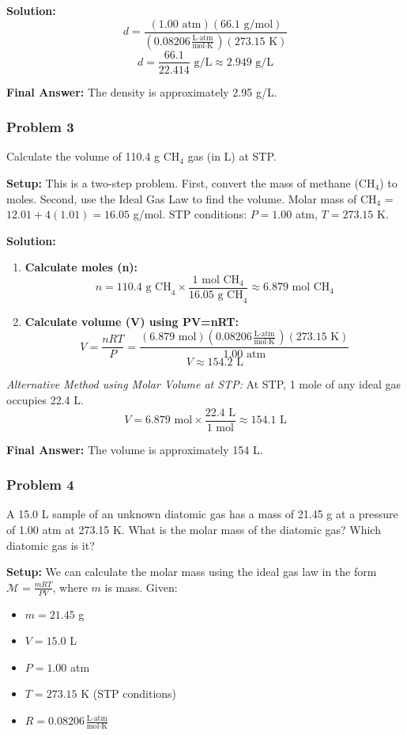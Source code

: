 \documentclass{article}
\begin{document}
\textbf{Solution:}
\[ d = \frac{(1.00 \text{ atm})(66.1 \text{ g/mol})}{(0.08206 \frac{\text{L} \cdot \text{atm}}{\text{mol} \cdot \text{K}})(273.15 \text{ K})} \]
\[ d = \frac{66.1}{22.414} \text{ g/L} \approx 2.949 \text{ g/L} \]

\textbf{Final Answer:} The density is approximately 2.95 g/L.

\subsubsection{Problem 3}
Calculate the volume of 110.4 g CH$_4$ gas (in L) at STP.

\textbf{Setup:}
This is a two-step problem. First, convert the mass of methane (CH$_4$) to moles. Second, use the Ideal Gas Law to find the volume.
Molar mass of CH$_4$ = $12.01 + 4(1.01) = 16.05$ g/mol.
STP conditions: $P=1.00$ atm, $T=273.15$ K.

\textbf{Solution:}
\begin{enumerate}
    \item \textbf{Calculate moles (n):}
    \[ n = 110.4 \text{ g CH}_4 \times \frac{1 \text{ mol CH}_4}{16.05 \text{ g CH}_4} \approx 6.879 \text{ mol CH}_4 \]
    \item \textbf{Calculate volume (V) using PV=nRT:}
    \[ V = \frac{nRT}{P} = \frac{(6.879 \text{ mol})(0.08206 \frac{\text{L} \cdot \text{atm}}{\text{mol} \cdot \text{K}})(273.15 \text{ K})}{1.00 \text{ atm}} \]
    \[ V \approx 154.2 \text{ L} \]
\end{enumerate}

\textit{Alternative Method using Molar Volume at STP:} At STP, 1 mole of any ideal gas occupies 22.4 L.
\[ V = 6.879 \text{ mol} \times \frac{22.4 \text{ L}}{1 \text{ mol}} \approx 154.1 \text{ L} \]

\textbf{Final Answer:} The volume is approximately 154 L.

\subsubsection{Problem 4}
A 15.0 L sample of an unknown diatomic gas has a mass of 21.45 g at a pressure of 1.00 atm at 273.15 K. What is the molar mass of the diatomic gas? Which diatomic gas is it?

\textbf{Setup:}
We can calculate the molar mass using the ideal gas law in the form $\mathcal{M} = \frac{mRT}{PV}$, where $m$ is mass.
Given:
\begin{itemize}
    \item $m = 21.45$ g
    \item $V = 15.0$ L
    \item $P = 1.00$ atm
    \item $T = 273.15$ K (STP conditions)
    \item $R = 0.08206 \frac{\text{L} \cdot \text{atm}}{\text{mol} \cdot \text{K}}$
\end{itemize}
\end{document}
